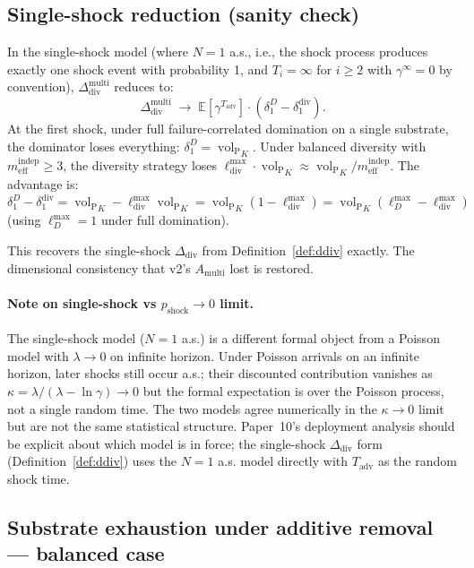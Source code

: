 \documentclass{article}
\DeclareMathOperator{\vol}{vol}
\newcommand{\volL}{{\vol_{\mathrm{P}}}}
\newcommand{\mindep}{m_{\mathrm{eff}}^{\mathrm{indep}}}
\newcommand{\Tadv}{T_{\mathrm{adv}}}
\newcommand{\Ddiv}{\Delta_{\mathrm{div}}}
\newcommand{\pshock}{p_{\mathrm{shock}}}
\newcommand{\lossDmax}{\ell_D^{\max}}
\newcommand{\lossdivmax}{\ell_{\mathrm{div}}^{\max}}
\begin{document}
\subsection{Single-shock reduction (sanity check)}
\label{sec:multishock_marginal}

In the single-shock model (where $N = 1$ a.s., i.e., the shock
process produces exactly one shock event with probability 1, and
$T_i = \infty$ for $i \geq 2$ with $\gamma^{\infty} = 0$ by
convention), $\Ddiv^{\mathrm{multi}}$ reduces to:
\[
  \Ddiv^{\mathrm{multi}} \;\to\; \mathbb{E}[\gamma^{\Tadv}] \cdot
  (\delta_1^D - \delta_1^{\mathrm{div}}).
\]
At the first shock, under full failure-correlated domination on a
single substrate, the dominator loses everything: $\delta_1^D = \volL_K$.
Under balanced diversity with $\mindep \geq 3$, the diversity
strategy loses $\lossdivmax \cdot \volL_K \approx \volL_K / \mindep$.
The advantage is:
\[
  \delta_1^D - \delta_1^{\mathrm{div}} = \volL_K - \lossdivmax \volL_K
  = \volL_K(1 - \lossdivmax) = \volL_K(\lossDmax - \lossdivmax)
\]
(using $\lossDmax = 1$ under full domination).

This recovers the single-shock $\Ddiv$ from
Definition~\ref{def:ddiv} exactly.  The dimensional consistency
that v2's $A_{\mathrm{multi}}$ lost is restored.

\paragraph{Note on single-shock vs $\pshock \to 0$ limit.}
The single-shock model ($N=1$ a.s.) is a different formal object
from a Poisson model with $\lambda \to 0$ on infinite horizon.
Under Poisson arrivals on an infinite horizon, later shocks still
occur a.s.; their discounted contribution vanishes as
$\kappa = \lambda/(\lambda - \ln \gamma) \to 0$ but the formal
expectation is over the Poisson process, not a single random time.
The two models agree numerically in the $\kappa \to 0$ limit but
are not the same statistical structure.  Paper~10's deployment
analysis should be explicit about which model is in force; the
single-shock $\Ddiv$ form (Definition~\ref{def:ddiv}) uses the
$N=1$ a.s. model directly with $\Tadv$ as the random shock time.

\subsection{Substrate exhaustion under additive removal --- balanced case}
\label{sec:substrate_exhaustion}
\end{document}
